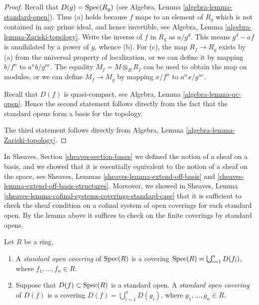 \begin{proof}
Recall that $D(g) = \mathop{\mathrm{Spec}}(R_g)$ (see
Algebra, Lemma \ref{algebra-lemma-standard-open}).
Thus (a) holds because $f$
maps to an element of $R_g$ which is not
contained in any prime ideal, and hence invertible,
see Algebra, Lemma \ref{algebra-lemma-Zariski-topology}.
Write the inverse of $f$ in $R_g$ as $a/g^d$.
This means $g^d - af$ is annihilated by a power of $g$, whence (b).
For (c), the map $R_f \to R_g$ exists by (a) from the universal property
of localization, or we can define it by mapping $b/f^n$
to $a^nb/g^{ne}$. The equality $M_f = M \otimes_R R_f$
can be used to obtain the map on modules, or
we can define $M_f \to M_g$ by mapping
$x/f^n$ to $a^nx/g^{ne}$.

\medskip\noindent
Recall that $D(f)$ is quasi-compact, see
Algebra, Lemma \ref{algebra-lemma-qc-open}.
Hence the second statement follows directly
from the fact that the standard opens form
a basis for the topology.

\medskip\noindent
The third statement follows directly from
Algebra, Lemma \ref{algebra-lemma-Zariski-topology}.
\end{proof}

\noindent
In Sheaves, Section \ref{sheaves-section-bases} we defined
the notion of a sheaf on a basis, and we showed that it is
essentially equivalent to the notion of a sheaf on the space,
see Sheaves, Lemmas \ref{sheaves-lemma-extend-off-basis} and
\ref{sheaves-lemma-extend-off-basis-structures}. Moreover,
we showed in
Sheaves, Lemma \ref{sheaves-lemma-cofinal-systems-coverings-standard-case}
that it is sufficient to check the sheaf
condition on a cofinal system of open coverings for each
standard open. By the lemma above it suffices to check
on the finite coverings by standard opens.

\begin{definition}
\label{definition-standard-covering}
Let $R$ be a ring.
\begin{enumerate}
\item A {\it standard open covering} of $\mathop{\mathrm{Spec}}(R)$
is a covering $\mathop{\mathrm{Spec}}(R) = \bigcup_{i = 1}^n D(f_i)$,
where $f_1, \ldots, f_n \in R$.
\item Suppose that $D(f) \subset \mathop{\mathrm{Spec}}(R)$ is a standard
open. A {\it standard open covering} of $D(f)$
is a covering $D(f) = \bigcup_{i = 1}^n D(g_i)$,
where $g_1, \ldots, g_n \in R$.
\end{enumerate}
\end{definition}

